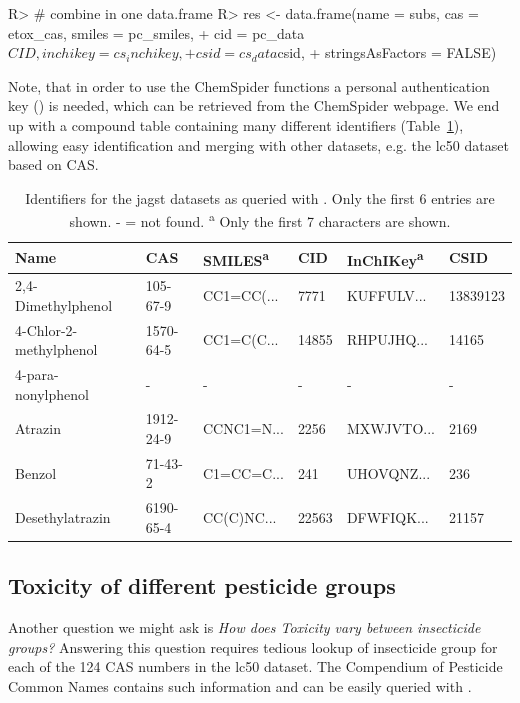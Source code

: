 \documentclass[article, shortnames]{jss}\usepackage[]{graphicx}\usepackage[]{color}
\begin{document}
\begin{CodeChunk}
\begin{CodeInput}
R> # combine in one data.frame
R> res <- data.frame(name = subs, cas = etox_cas, smiles = pc_smiles, 
+                    cid = pc_data$CID, inchikey = cs_inchikey, 
+                    csid = cs_data$csid, 
+                    stringsAsFactors = FALSE)
\end{CodeInput}
\end{CodeChunk}

Note, that in order to use the ChemSpider functions a personal authentication key () is needed, which can be retrieved from the ChemSpider webpage. 
We end up with a compound table containing many different identifiers (Table~\ref{tab:comptable}), allowing easy identification and merging with other datasets, e.g. the lc50 dataset based on CAS.

\begin{table}[ht]
\centering
\begin{CodeChunk}
\begin{tabular}{llllll}
  \toprule
Name & CAS & SMILES\textsuperscript{a} & CID & InChIKey\textsuperscript{a} & CSID \\ 
  \midrule
2,4-Dimethylphenol & 105-67-9 & CC1=CC(... & 7771 & KUFFULV... & 13839123 \\ 
  4-Chlor-2-methylphenol & 1570-64-5 & CC1=C(C... & 14855 & RHPUJHQ... & 14165 \\ 
  4-para-nonylphenol & - & - & - & - & - \\ 
  Atrazin & 1912-24-9 & CCNC1=N... & 2256 & MXWJVTO... & 2169 \\ 
  Benzol & 71-43-2 & C1=CC=C... & 241 & UHOVQNZ... & 236 \\ 
  Desethylatrazin & 6190-65-4 & CC(C)NC... & 22563 & DFWFIQK... & 21157 \\ 
   \bottomrule
\end{tabular}
\end{CodeChunk}
\caption{Identifiers for the jagst datasets as queried with . Only the first 6 entries are shown. - = not found. \textsuperscript{a} Only the first 7 characters are shown.}
\label{tab:comptable}
\end{table}


\subsection[Toxicity of different pesticide groups]{Toxicity of different pesticide groups}
Another question we might ask is \emph{How does Toxicity vary between insecticide groups?}
Answering this question requires tedious lookup of insecticide group for each of the 124 CAS numbers in the lc50 dataset.
The Compendium of Pesticide Common Names \citep{wood} contains such information and can be easily queried with .
\end{document}
